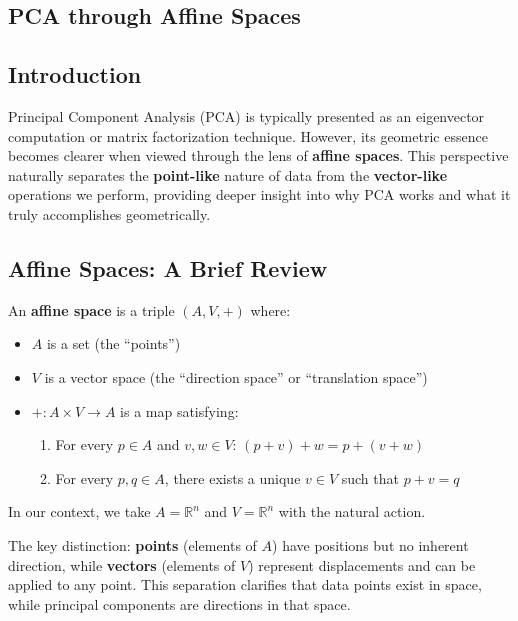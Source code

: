 \begin{notechapter}
\chapter{PCA through Affine Spaces}\label{ch:pca-affine}

\section{Introduction}

Principal Component Analysis (PCA) is typically presented as an eigenvector computation or matrix factorization technique. However, its geometric essence becomes clearer when viewed through the lens of \textbf{affine spaces}. This perspective naturally separates the \textbf{point-like} nature of data from the \textbf{vector-like} operations we perform, providing deeper insight into why PCA works and what it truly accomplishes geometrically.

\section{Affine Spaces: A Brief Review}

\begin{definition}
An \textbf{affine space} is a triple $(A, V, +)$ where:
\begin{itemize}
    \item $A$ is a set (the ``points'')
    \item $V$ is a vector space (the ``direction space'' or ``translation space'')
    \item $+ : A \times V \to A$ is a map satisfying:
    \begin{enumerate}
        \item For every $p \in A$ and $v,w \in V$: $(p + v) + w = p + (v + w)$
        \item For every $p,q \in A$, there exists a unique $v \in V$ such that $p + v = q$
    \end{enumerate}
\end{itemize}
\end{definition}

In our context, we take $A = \mathbb{R}^n$ and $V = \mathbb{R}^n$ with the natural action.

\begin{remark}
The key distinction: \textbf{points} (elements of $A$) have positions but no inherent direction, while \textbf{vectors} (elements of $V$) represent displacements and can be applied to any point. This separation clarifies that data points exist in space, while principal components are directions in that space.
\end{remark}


\end{notechapter}
